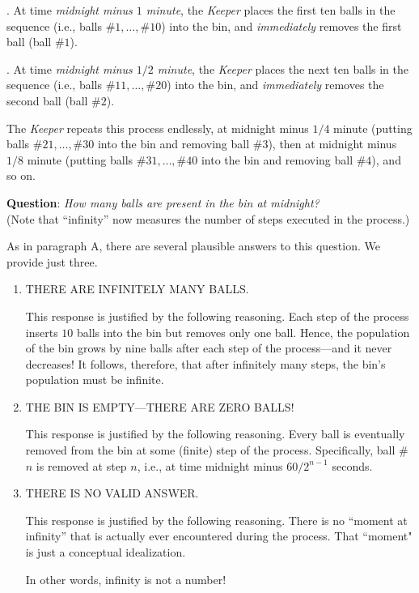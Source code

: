 \smallskip

.
At time {\em midnight minus $1$ minute}, the {\it Keeper} places the first ten balls in the sequence (i.e., balls $\#1, \ldots, \#10$) into the bin, and {\em immediately} removes the first ball (ball \#$1$).

\smallskip

.
At time {\em midnight minus $1/2$ minute}, the {\it Keeper} places the next ten balls in the sequence
(i.e., balls $\#11, \ldots, \#20$) into the bin, and {\em immediately} removes the second ball (ball \#$2$).

\smallskip

\noindent
The {\it Keeper} repeats this process endlessly, at midnight minus $1/4$ minute (putting balls $\#21, \ldots, \#30$ into the bin and removing ball \#$3$), then at midnight minus $1/8$ minute (putting balls $\#31, \ldots, \#40$ into the bin and removing ball \#$4$), and so on.

\smallskip

\noindent
{\bf Question}: {\it How many balls are present in the bin at midnight?}  \\
(Note that ``infinity'' now measures the number of steps executed in the process.)

\medskip

\noindent
As in paragraph {\small\sf A}, there are several plausible answers to this question.  We provide just three.
\begin{enumerate}
\item
THERE ARE INFINITELY MANY BALLS.

\smallskip

This response is justified by the following reasoning.  Each step of the process inserts $10$ balls into the bin but removes only one ball.  Hence, the population of the bin grows by nine balls after each step of the process---and it never decreases!  It follows, therefore, that after infinitely many steps, the bin's population must be infinite.

\medskip\item
THE BIN IS EMPTY---THERE ARE ZERO BALLS!

\smallskip

This response is justified by the following reasoning.  Every ball is eventually removed from the bin at some (finite) step of the process. Specifically, ball \#$n$ is removed at step $n$, i.e., at time midnight minus $60/2^{n-1}$ seconds.

\medskip\item
THERE IS NO VALID ANSWER.

\smallskip

This response is justified by the following reasoning.  There is no ``moment at infinity'' that is actually ever encountered during the process.  That ``moment" is just a conceptual idealization.

\smallskip

In other words, infinity is not a number!
\end{enumerate}


